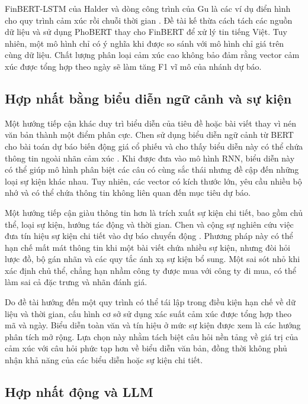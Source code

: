 \documentclass[12pt, a4paper, oneside]{report}
\begin{document}
FinBERT-LSTM của Halder và dòng công trình của Gu là các ví dụ điển hình cho quy trình cảm xúc rồi chuỗi thời gian \cite{Halder2022_221107392v1,Gu2024_240716150v1}.
Đề tài kế thừa cách tách các nguồn dữ liệu và sử dụng PhoBERT thay cho FinBERT để xử lý
tin tiếng Việt. Tuy nhiên, một mô hình chỉ có ý nghĩa khi được so sánh với mô hình chỉ giá trên cùng dữ liệu. Chất lượng phân loại cảm xúc cao
không bảo đảm rằng vector cảm xúc được tổng hợp theo ngày sẽ làm tăng F1 vĩ mô của
nhánh dự báo.

\subsection{Hợp nhất bằng biểu diễn ngữ cảnh và sự kiện}

Một hướng tiếp cận khác duy trì biểu diễn của tiêu đề hoặc bài viết thay vì nén văn
bản thành một điểm phân cực. Chen sử dụng biểu diễn ngữ cảnh từ BERT cho bài toán dự
báo biến động giá cổ phiếu và cho thấy biểu diễn này có thể chứa thông tin ngoài nhãn
cảm xúc \cite{Chen2021_210708721v1}. Khi được đưa vào mô hình RNN, biểu diễn này có thể
giúp mô hình phân biệt các câu có cùng sắc thái nhưng đề cập đến những loại sự kiện
khác nhau. Tuy nhiên, các vector có kích thước lớn, yêu cầu nhiều bộ nhớ và có thể chứa
thông tin không liên quan đến mục tiêu dự báo.

Một hướng tiếp cận giàu thông tin hơn là trích xuất sự kiện chi tiết, bao gồm chủ thể,
loại sự kiện, hướng tác động và thời gian. Chen và cộng sự nghiên cứu việc đưa tín hiệu
sự kiện chi tiết vào dự báo chuyển động \cite{Chen2019_191005078v1}. Phương pháp này có
thể hạn chế mất mát thông tin khi một bài viết chứa nhiều sự kiện, nhưng đòi hỏi lược
đồ, bộ gán nhãn và các quy tắc ánh xạ sự kiện bổ sung. Một sai sót nhỏ khi xác định chủ
thể, chẳng hạn nhầm công ty được mua với công ty đi mua, có thể làm sai cả đặc trưng
và nhãn đánh giá.

Do đề tài hướng đến một quy trình có thể tái lập trong điều kiện hạn chế về dữ liệu và
thời gian, cấu hình cơ sở sử dụng xác suất cảm xúc được tổng hợp theo mã và ngày. Biểu
diễn toàn văn và tín hiệu ở mức sự kiện được xem là các hướng phân tích mở rộng. Lựa
chọn này nhằm tách biệt câu hỏi nền tảng về giá trị của cảm xúc với câu hỏi phức tạp
hơn về biểu diễn văn bản, đồng thời không phủ nhận khả năng của các biểu diễn hoặc sự
kiện chi tiết.

\subsection{Hợp nhất động và LLM}
\end{document}
